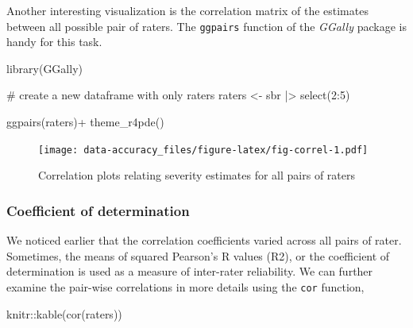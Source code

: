 \documentclass[
  letterpaper,
]{book}
\newenvironment{Shaded}{\begin{snugshade}}{\end{snugshade}}
\newcommand{\CommentTok}[1]{\textcolor[rgb]{0.37,0.37,0.37}{#1}}
\newcommand{\DecValTok}[1]{\textcolor[rgb]{0.68,0.00,0.00}{#1}}
\newcommand{\FunctionTok}[1]{\textcolor[rgb]{0.28,0.35,0.67}{#1}}
\newcommand{\NormalTok}[1]{\textcolor[rgb]{0.00,0.23,0.31}{#1}}
\newcommand{\OtherTok}[1]{\textcolor[rgb]{0.00,0.23,0.31}{#1}}
\newcommand{\SpecialCharTok}[1]{\textcolor[rgb]{0.37,0.37,0.37}{#1}}
\begin{document}
Another interesting visualization is the correlation matrix of the
estimates between all possible pair of raters. The \texttt{ggpairs}
function of the \emph{GGally} package is handy for this task.

\begin{Shaded}
\begin{Highlighting}[]
\FunctionTok{library}\NormalTok{(GGally)}


\CommentTok{\# create a new dataframe with only raters}
\NormalTok{raters }\OtherTok{\textless{}{-}}\NormalTok{ sbr }\SpecialCharTok{|\textgreater{}} 
  \FunctionTok{select}\NormalTok{(}\DecValTok{2}\SpecialCharTok{:}\DecValTok{5}\NormalTok{)}

\FunctionTok{ggpairs}\NormalTok{(raters)}\SpecialCharTok{+}
  \FunctionTok{theme\_r4pde}\NormalTok{()}
\end{Highlighting}
\end{Shaded}

\begin{figure}

{\centering \texttt{[image: data-accuracy\_files/figure-latex/fig-correl-1.pdf]}

}

\caption{\label{fig-correl}Correlation plots relating severity estimates
for all pairs of raters}

\end{figure}

\hypertarget{coefficient-of-determination}{%
\subsubsection{Coefficient of
determination}\label{coefficient-of-determination}}

We noticed earlier that the correlation coefficients varied across all
pairs of rater. Sometimes, the means of squared Pearson's R values (R2),
or the coefficient of determination is used as a measure of inter-rater
reliability. We can further examine the pair-wise correlations in more
details using the \texttt{cor} function,

\begin{Shaded}
\begin{Highlighting}[]
\NormalTok{knitr}\SpecialCharTok{::}\FunctionTok{kable}\NormalTok{(}\FunctionTok{cor}\NormalTok{(raters))}
\end{Highlighting}
\end{Shaded}
\end{document}
